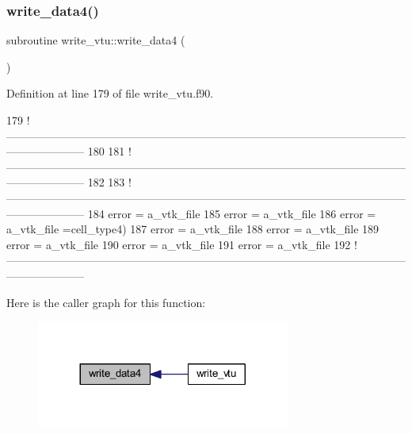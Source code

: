 \subsubsection{\texorpdfstring{write\+\_\+data4()}{write\_data4()}}
{\footnotesize\ttfamily subroutine write\+\_\+vtu\+::write\+\_\+data4 (\begin{DoxyParamCaption}{ }\end{DoxyParamCaption})}



Definition at line 179 of file write\+\_\+vtu.\+f90.


\begin{DoxyCode}
179   \textcolor{comment}{
      !---------------------------------------------------------------------------------------------------------------------------------}
180   
181   \textcolor{comment}{
      !---------------------------------------------------------------------------------------------------------------------------------}
182 
183   \textcolor{comment}{
      !---------------------------------------------------------------------------------------------------------------------------------}
184   error = a\_vtk\_file%
185   error = a\_vtk\_file%
186   error = a\_vtk\_file%
      =cell\_type4)
187   error = a\_vtk\_file%
188   error = a\_vtk\_file%
189   error = a\_vtk\_file%
190   error = a\_vtk\_file%
191   error = a\_vtk\_file%
192   \textcolor{comment}{
      !---------------------------------------------------------------------------------------------------------------------------------}
\end{DoxyCode}
Here is the caller graph for this function\+:
\nopagebreak
\begin{figure}[H]
\begin{center}
\leavevmode
\includegraphics[width=236pt]{write__vtu_8f90_a2a0b4e97269ec439c6dd440509f9742c_icgraph}
\end{center}
\end{figure}
\mbox{\label{write__vtu_8f90_a8bbc7ab4725ee50b236ba1ffab6f3b88}} 
